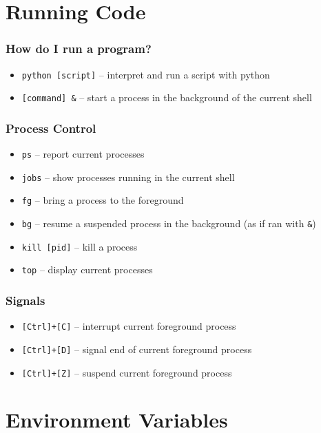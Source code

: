 \documentclass[aspectratio=169]{beamer}
\begin{document}

\section{Running Code}

\frame{\sectionpage}

\begin{frame}
	\frametitle{How do I run a program?}
	\begin{itemize}
		\item \texttt{python [script]} -- interpret and run a script with python
		\item \texttt{[command] \&} -- start a process in the background of the current shell
	\end{itemize}
\end{frame}

\begin{frame}
	\frametitle{Process Control}
	\begin{itemize}
		\item \texttt{ps} -- report current processes
		\item \texttt{jobs} -- show processes running in the current shell
		\item \texttt{fg} -- bring a process to the foreground
		\item \texttt{bg} -- resume a suspended process in the background (as if ran with \texttt{\&})
		\item \texttt{kill [pid]} -- kill a process
		\item \texttt{top} -- display current processes
	\end{itemize}
\end{frame}

\begin{frame}
	\frametitle{Signals}
	\begin{itemize}
		\item \texttt{[Ctrl]+[C]} -- interrupt current foreground process
		\item \texttt{[Ctrl]+[D]} -- signal end of current foreground process
		\item \texttt{[Ctrl]+[Z]} -- suspend current foreground process
	\end{itemize}
\end{frame}


\section{Environment Variables}
\end{document}
